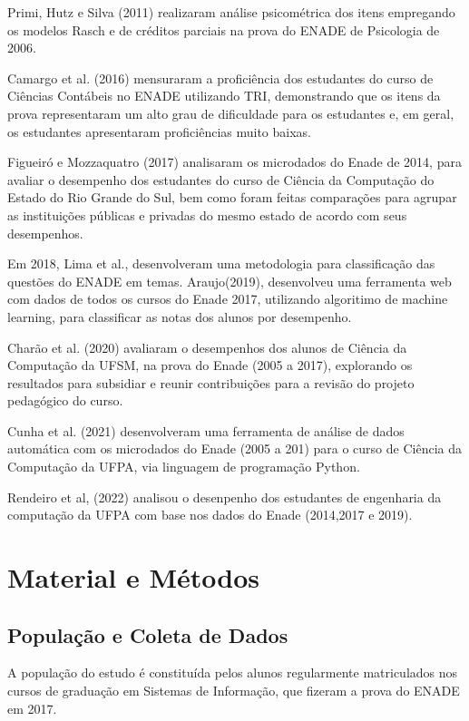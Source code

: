 \documentclass[12pt]{article}
\begin{document}
 Primi, Hutz e Silva (2011) realizaram análise psicométrica dos itens empregando os modelos Rasch e de créditos parciais na prova do ENADE de Psicologia de 2006.

Camargo et al. (2016) mensuraram a proficiência dos estudantes do curso de Ciências Contábeis no ENADE utilizando TRI, demonstrando que os itens da prova representaram um alto grau de dificuldade para os estudantes e, em geral, os estudantes apresentaram proficiências muito baixas.

\newpage
Figueiró e Mozzaquatro (2017) analisaram os microdados do Enade de 2014, para avaliar o desempenho dos estudantes do curso de Ciência da
Computação do Estado do Rio Grande do Sul, bem como foram feitas comparações para
agrupar as instituições públicas e privadas do mesmo estado de acordo com seus
desempenhos.


Em 2018, Lima et al., desenvolveram uma metodologia para classificação das questões do ENADE em temas. Araujo(2019), desenvolveu uma ferramenta web com dados de todos os cursos do Enade 2017, utilizando algoritimo de machine learning, para classificar as notas dos alunos por desempenho.

Charão et al. (2020) avaliaram o desempenhos dos alunos de Ciência da Computação da UFSM, na prova do Enade (2005 a 2017), explorando os resultados para subsidiar e reunir contribuições para a revisão do projeto pedagógico do curso. 

Cunha et al. (2021) desenvolveram uma ferramenta de análise de dados automática com os microdados do Enade (2005 a 201) para o curso de Ciência da Computação da UFPA, via linguagem de programação Python.

Rendeiro et al, (2022) analisou o desenpenho dos estudantes de engenharia da computação da UFPA com base nos dados do Enade (2014,2017 e 2019).




\section{Material e Métodos}
\subsection{População e Coleta de Dados}

A população do estudo é constituída pelos alunos regularmente matriculados nos cursos de graduação em Sistemas de Informação, que fizeram a prova do ENADE em 2017. 
\end{document}
